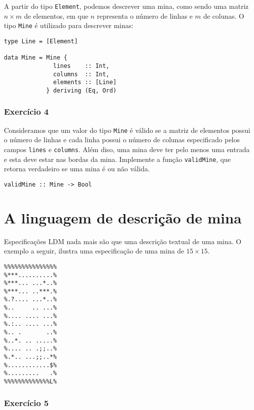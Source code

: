 \documentclass[a4paper]{article}
\begin{document}
A partir do tipo \texttt{Element}, podemos descrever uma mina, como sendo uma
matriz \(n\times m\) de elementos, em que \(n\) representa o número de linhas e \(m\) de
colunas. O tipo \texttt{Mine} é utilizado para descrever minas:

\begin{verbatim}
type Line = [Element]

data Mine = Mine {
              lines    :: Int,
              columns  :: Int,
              elements :: [Line]
            } deriving (Eq, Ord)  
\end{verbatim}


\subsubsection{Exercício 4}
\label{sec:org77ed190}

Consideramos que um valor do tipo \texttt{Mine} é válido
se a matriz de elementos possui o número de linhas e cada linha possui o número
de colunas especificado pelos campos \texttt{lines} e \texttt{columns}. Além diso,
uma mina deve ter pelo menos uma entrada e esta deve estar nas bordas da mina.
Implemente a função \texttt{validMine}, que retorna verdadeiro se uma mina é ou
não válida.

\begin{verbatim}
validMine :: Mine -> Bool
\end{verbatim}

\section{A linguagem de descrição de mina}
\label{sec:org409539a}

Especificações LDM nada mais são que uma descrição textual de uma mina.
O exemplo a seguir, ilustra uma especificação de uma mina de \(15\times 15\).

\begin{verbatim}
%%%%%%%%%%%%%%%
%***..........%
%***... ...*..%
%***... ..***.%
%.?.... ...*..%
%..     .. ...%
%.... .... ...%
%.:.. .... ...%
%.. .       ..%
%..*. .. .....%
%.... .. .;;..%
%.*.. ...;;..*%
%............$%
%.........   .%
%%%%%%%%%%%%%L%
\end{verbatim}

\subsubsection{Exercício 5}
\label{sec:org5bcba5d}
\end{document}
